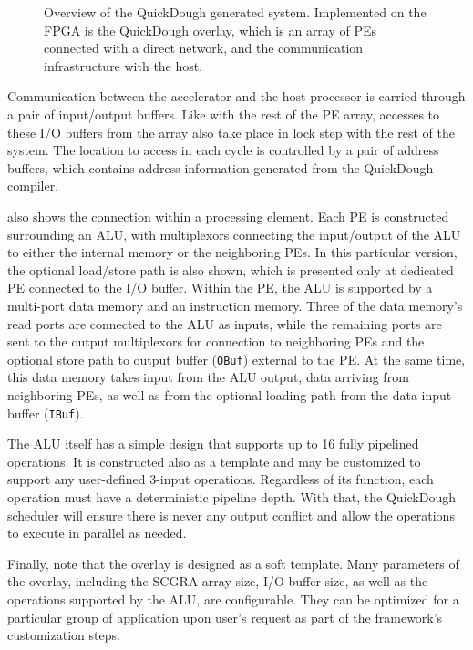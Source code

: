 \begin{figure}
    \caption{Overview of the QuickDough generated system.  Implemented on the FPGA is the QuickDough overlay, which is an array of PEs connected with a direct network, and the communication infrastructure with the host.}
    \label{fig:qd_overlay}
\end{figure}

Communication between the accelerator and the host processor is carried through a pair of input/output buffers.
Like with the rest of the PE array, accesses to these I/O buffers from the array also take place in lock step with the rest of the system.
The location to access in each cycle is controlled by a pair of address buffers, which contains address information generated from the QuickDough compiler. 

 also shows the connection within a processing element.
Each PE is constructed surrounding an ALU, with multiplexors connecting the input/output of the ALU to either the internal memory or the neighboring PEs.
In this particular version, the optional load/store path is also shown, which is presented only at dedicated PE connected to the I/O buffer.
Within the PE, the ALU is supported by a multi-port data memory and an instruction memory.
Three of the data memory's read ports are connected to the ALU as inputs, while the remaining ports are sent to the output multiplexors for connection to neighboring PEs and the optional store path to output buffer (\texttt{OBuf}) external to the PE.
At the same time, this data memory takes input from the ALU output, data arriving from neighboring PEs, as well as from the optional loading path from the data input buffer (\texttt{IBuf}).

The ALU itself has a simple design that supports up to 16 fully pipelined operations.
It is constructed also as a template and may be customized to support any user-defined 3-input operations.
Regardless of its function, each operation must have a deterministic pipeline depth.
With that, the QuickDough scheduler will ensure there is never any output conflict and allow the operations to execute in parallel as needed.

Finally, note that the overlay is designed as a soft template.
Many parameters of the overlay, including the SCGRA array size, I/O buffer size, as well as the operations supported by the ALU, are configurable.
They can be optimized for a particular group of application upon user's request as part of the framework's customization steps.






